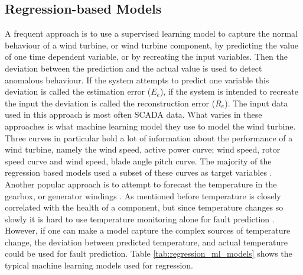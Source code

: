 \subsection{Regression-based Models}
A frequent approach is to use a supervised learning model to capture the normal behaviour of a wind turbine, or wind turbine component, by predicting the value of one time dependent variable, or by recreating the input variables. 
Then the deviation between the prediction and the actual value is used to detect anomalous behaviour. 
If the system attempts to predict one variable this deviation is called the estimation error ($E_e$), if the system is intended to recreate the input the deviation is called the reconstruction error ($R_e$).
The input data used in this approach is most often SCADA data. 
What varies in these approaches is what machine learning model they use to model the wind turbine. 
Three curves in particular hold a lot of information about the performance of a wind turbine, namely the wind speed, active power curve; wind speed, rotor speed curve and wind speed, blade angle pitch curve. 
The majority of the regression based models used a subset of these curves as target variables \cite{perf_mon_of_wt_using_extreme_func_theory, GP_operational_curve_monitoring, high_freq_scada_perf_monit_sensitivity, abnormal_detection_scada_data_mining, improved_power_curve_monitoring_of_wt, SVR_blade_pitch_curve_cm, health_cond_model_nn_proportional_hazard_models}. 
Another popular approach is to attempt to forecast the temperature in the gearbox, or generator windings \cite{AD_and_fault_analysis_wt_DAE, health_cond_model_nn_proportional_hazard_models, detecting_malfunctions_wt_generator_bearings_generic_vs_specific_models, CBPM_ABPM_maintainance_model, wt_gearbox_bearing_temp_KS_CNN, DBN_chicken_swarm_optim}. 
As mentioned before temperature is closely correlated with the health of a component, but since temperature changes so slowly it is hard to use temperature monitoring alone for fault prediction \cite{wt_cm_rev_new_trends_chal_2014}. 
However, if one can make a model capture the complex sources of temperature change, the deviation between predicted temperature, and actual temperature could be used for fault prediction. 
Table \ref{tab:regression_ml_models} shows the typical machine learning models used for regression. 

